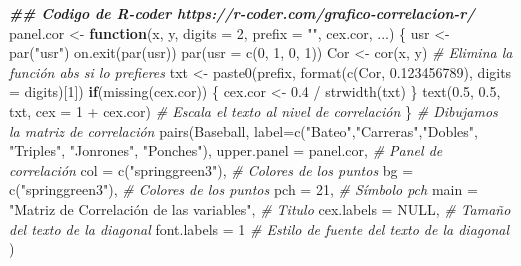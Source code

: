 \documentclass{staprojteamusb}
\newenvironment{Shaded}{\begin{snugshade}}{\end{snugshade}}
\newcommand{\AttributeTok}[1]{\textcolor[rgb]{0.77,0.63,0.00}{#1}}
\newcommand{\CommentTok}[1]{\textcolor[rgb]{0.56,0.35,0.01}{\textit{#1}}}
\newcommand{\ConstantTok}[1]{\textcolor[rgb]{0.00,0.00,0.00}{#1}}
\newcommand{\ControlFlowTok}[1]{\textcolor[rgb]{0.13,0.29,0.53}{\textbf{#1}}}
\newcommand{\DecValTok}[1]{\textcolor[rgb]{0.00,0.00,0.81}{#1}}
\newcommand{\DocumentationTok}[1]{\textcolor[rgb]{0.56,0.35,0.01}{\textbf{\textit{#1}}}}
\newcommand{\FloatTok}[1]{\textcolor[rgb]{0.00,0.00,0.81}{#1}}
\newcommand{\FunctionTok}[1]{\textcolor[rgb]{0.00,0.00,0.00}{#1}}
\newcommand{\NormalTok}[1]{#1}
\newcommand{\OtherTok}[1]{\textcolor[rgb]{0.56,0.35,0.01}{#1}}
\newcommand{\SpecialCharTok}[1]{\textcolor[rgb]{0.00,0.00,0.00}{#1}}
\newcommand{\StringTok}[1]{\textcolor[rgb]{0.31,0.60,0.02}{#1}}
\begin{document}
\begin{Shaded}
\begin{Highlighting}[]
\DocumentationTok{\#\# Codigo de R{-}coder https://r{-}coder.com/grafico{-}correlacion{-}r/}
\NormalTok{panel.cor }\OtherTok{\textless{}{-}} \ControlFlowTok{function}\NormalTok{(x, y, }\AttributeTok{digits =} \DecValTok{2}\NormalTok{, }\AttributeTok{prefix =} \StringTok{""}\NormalTok{, cex.cor, ...) \{}
\NormalTok{    usr }\OtherTok{\textless{}{-}} \FunctionTok{par}\NormalTok{(}\StringTok{"usr"}\NormalTok{)}
    \FunctionTok{on.exit}\NormalTok{(}\FunctionTok{par}\NormalTok{(usr))}
    \FunctionTok{par}\NormalTok{(}\AttributeTok{usr =} \FunctionTok{c}\NormalTok{(}\DecValTok{0}\NormalTok{, }\DecValTok{1}\NormalTok{, }\DecValTok{0}\NormalTok{, }\DecValTok{1}\NormalTok{))}
\NormalTok{    Cor }\OtherTok{\textless{}{-}} \FunctionTok{cor}\NormalTok{(x, y) }\CommentTok{\# Elimina la función abs si lo prefieres}
\NormalTok{    txt }\OtherTok{\textless{}{-}} \FunctionTok{paste0}\NormalTok{(prefix, }\FunctionTok{format}\NormalTok{(}\FunctionTok{c}\NormalTok{(Cor, }\FloatTok{0.123456789}\NormalTok{), }\AttributeTok{digits =}\NormalTok{ digits)[}\DecValTok{1}\NormalTok{])}
    \ControlFlowTok{if}\NormalTok{(}\FunctionTok{missing}\NormalTok{(cex.cor)) \{}
\NormalTok{        cex.cor }\OtherTok{\textless{}{-}} \FloatTok{0.4} \SpecialCharTok{/} \FunctionTok{strwidth}\NormalTok{(txt)}
\NormalTok{    \}}
    \FunctionTok{text}\NormalTok{(}\FloatTok{0.5}\NormalTok{, }\FloatTok{0.5}\NormalTok{, txt,}
         \AttributeTok{cex =} \DecValTok{1} \SpecialCharTok{+}\NormalTok{ cex.cor) }\CommentTok{\# Escala el texto al nivel de correlación}
\NormalTok{\}}
\CommentTok{\# Dibujamos la matriz de correlación}
\FunctionTok{pairs}\NormalTok{(Baseball,}
      \AttributeTok{label=}\FunctionTok{c}\NormalTok{(}\StringTok{"Bateo"}\NormalTok{,}\StringTok{"Carreras"}\NormalTok{,}\StringTok{"Dobles"}\NormalTok{, }\StringTok{"Triples"}\NormalTok{, }\StringTok{"Jonrones"}\NormalTok{, }\StringTok{"Ponches"}\NormalTok{),}
      \AttributeTok{upper.panel =}\NormalTok{ panel.cor,    }\CommentTok{\# Panel de correlación}
      \AttributeTok{col =} \FunctionTok{c}\NormalTok{(}\StringTok{"springgreen3"}\NormalTok{),  }\CommentTok{\# Colores de los puntos}
      \AttributeTok{bg =} \FunctionTok{c}\NormalTok{(}\StringTok{"springgreen3"}\NormalTok{),   }\CommentTok{\# Colores de los puntos}
      \AttributeTok{pch =} \DecValTok{21}\NormalTok{,                   }\CommentTok{\# Símbolo pch}
      \AttributeTok{main =} \StringTok{"Matriz de Correlación de las variables"}\NormalTok{,  }\CommentTok{\# Titulo}
      \AttributeTok{cex.labels =} \ConstantTok{NULL}\NormalTok{,        }\CommentTok{\# Tamaño del texto de la diagonal}
      \AttributeTok{font.labels =} \DecValTok{1}          \CommentTok{\# Estilo de fuente del texto de la diagonal}
\NormalTok{)}
\end{Highlighting}
\end{Shaded}
\end{document}
